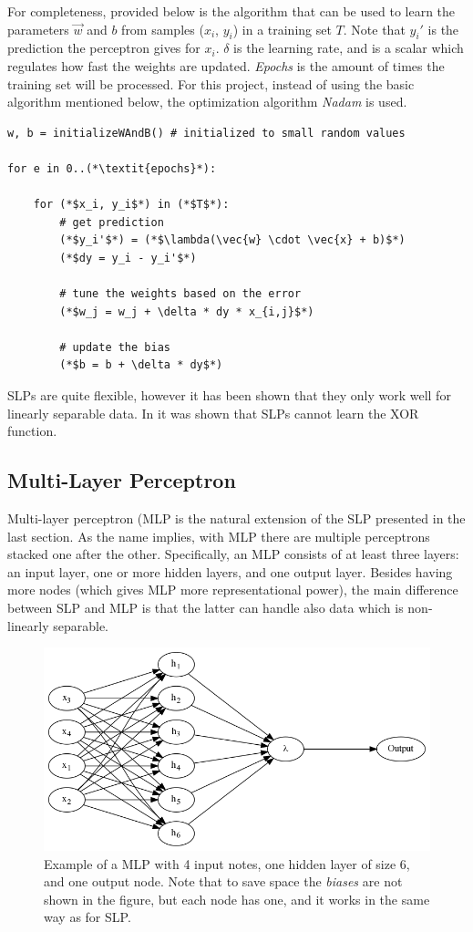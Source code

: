 \documentclass[epsfig,a4paper,11pt,titlepage,twoside,openany]{book}
\begin{document}
For completeness, provided below is the algorithm that can be used to learn the parameters $\vec{w}$ and $b$ from samples ($x_i$, $y_i$) in a training set $T$. Note that $y_i'$ is the prediction the perceptron gives for $x_i$. $\delta$ is the learning rate, and is a scalar which regulates how fast the weights are updated. \textit{Epochs} is the amount of times the training set will be processed. For this project, instead of using the basic algorithm mentioned below, the optimization algorithm \textit{Nadam} \cite{dozat2016incorporating_nadam} is used.


\begin{lstlisting}
w, b = initializeWAndB() # initialized to small random values 

for e in 0..(*\textit{epochs}*):
    
    for (*$x_i, y_i$*) in (*$T$*):
        # get prediction
        (*$y_i'$*) = (*$\lambda(\vec{w} \cdot \vec{x} + b)$*)
        (*$dy = y_i - y_i'$*)
        
        # tune the weights based on the error
        (*$w_j = w_j + \delta * dy * x_{i,j}$*)
        
        # update the bias
        (*$b = b + \delta * dy$*)

\end{lstlisting}

SLPs are quite flexible, however it has been shown that they only work well for linearly separable data. In \cite{minsky2017_paupert_xor} it was shown that SLPs cannot learn the XOR function.   




\subsection{Multi-Layer Perceptron}
\label{sec:clf-mlp}


Multi-layer perceptron (MLP \cite{Goodfellow-et-al-2016} is the natural extension of the SLP presented in the last section. As the name implies, with MLP there are multiple perceptrons stacked one after the other. Specifically, an MLP consists of at least three layers: an input layer, one or more hidden layers, and one output layer. Besides having more nodes (which gives MLP more representational power), the main difference between SLP and MLP is that the latter can handle also data which is non-linearly separable.


\begin{figure}[H]
  \centering \includegraphics[width=.5\textwidth]{mlp-example} 
  \caption{Example of a MLP with 4 input notes, one hidden layer of size 6, and one output node. Note that to save space the \textit{biases} are not shown in the figure, but each node has one, and it works in the same way as for SLP.}
  \label{fig:mlp-example}
\end{figure}
\end{document}
